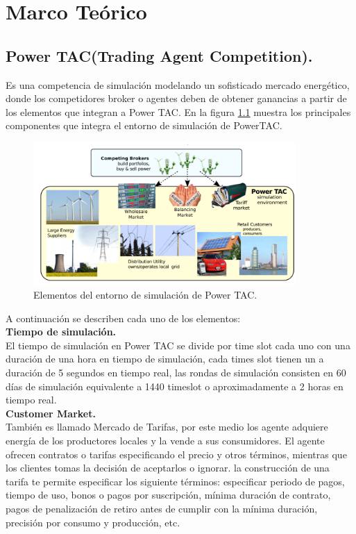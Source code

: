 \chapter{Marco Teórico}
\newpage
\section{Power TAC(Trading Agent Competition).}
Es una competencia de simulación modelando un sofisticado mercado energético, donde los competidores broker o agentes deben de obtener ganancias a partir de los elementos que integran a Power TAC. En la figura \ref{entorno} muestra los principales componentes que integra el entorno de simulación de PowerTAC.

\begin{figure}[!h]
    \centering
    \includegraphics[width=10cm]{img/entorno.png}
    \caption{Elementos del entorno de simulación de Power TAC.}
    \label{entorno}
\end{figure}

A continuación se describen cada uno de los elementos:\\

\textbf{Tiempo de simulación.}\\

El tiempo de simulación en Power TAC se divide por time slot cada uno con una duración de una hora en tiempo de simulación, cada times slot tienen un a duración de 5 segundos en tiempo real, las rondas de simulación consisten en 60 días de simulación equivalente a 1440 timeslot o aproximadamente a 2 horas en tiempo real.\\

\textbf{Customer Market.}\\

También es llamado Mercado de Tarifas, por este medio los agente adquiere energía de los productores locales y la vende a sus consumidores. El agente ofrecen contratos o tarifas especificando el precio y otros términos, mientras que los clientes tomas la decisión de aceptarlos o ignorar. la construcción de una tarifa te permite especificar los siguiente términos: especificar periodo de pagos, tiempo de uso, bonos o pagos por suscripción, mínima duración de contrato, pagos de penalización de retiro antes de cumplir con la mínima duración, precisión por consumo y producción, etc.\\


